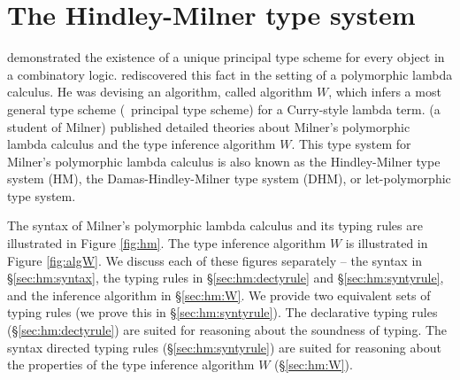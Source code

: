 \section{The Hindley-Milner type system} \label{sec:hm}

\citet{Hindley69} demonstrated the existence of a unique principal type scheme
for every object in a combinatory logic. \citet{Milner78} rediscovered this fact
in the setting of a polymorphic lambda calculus. He was devising
an algorithm, called algorithm $W$, which infers a most general
type scheme (\aka\ principal type scheme) for a Curry-style lambda term.
\citet{Damas85} (a student of Milner) published detailed theories about
Milner's polymorphic lambda calculus and the type inference algorithm $W$.
This type system for Milner's polymorphic lambda calculus \cite{Milner78,DamMil82,Damas85}
is also known as the Hindley-Milner type system (HM),
the Damas-Hindley-Milner type system (DHM), or let-polymorphic type system.

The syntax of Milner's polymorphic lambda calculus and its typing rules
are illustrated in Figure \ref{fig:hm}. The type inference algorithm $W$
is illustrated in Figure \ref{fig:algW}. We discuss each of these
figures separately -- the syntax in
\S\ref{sec:hm:syntax}, the typing rules in \S\ref{sec:hm:dectyrule} and
\S\ref{sec:hm:syntyrule}, and the inference algorithm in \S\ref{sec:hm:W}.
We provide two equivalent sets of typing rules (we prove this in \S\ref{sec:hm:syntyrule}).
The declarative typing rules (\S\ref{sec:hm:dectyrule}) are suited for
reasoning about the soundness of typing.
The syntax directed typing rules (\S\ref{sec:hm:syntyrule}) are suited
for reasoning about the properties of the type inference algorithm $W$
(\S\ref{sec:hm:W}).

